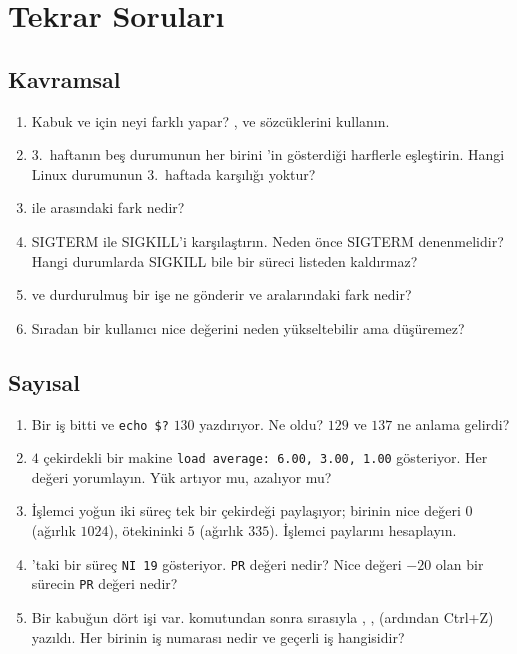 \section{Tekrar Soruları}

\subsection*{Kavramsal}
\begin{enumerate}[leftmargin=1.6em]
  \item Kabuk  ve  için neyi farklı yapar? ,  ve  sözcüklerini kullanın.
  \item 3.~haftanın beş durumunun her birini 'in gösterdiği harflerle eşleştirin. Hangi Linux durumunun 3.~haftada karşılığı yoktur?
  \item {} ile  arasındaki fark nedir?
  \item SIGTERM ile SIGKILL'i karşılaştırın. Neden önce SIGTERM denenmelidir? Hangi durumlarda SIGKILL bile bir süreci listeden kaldırmaz?
  \item {} ve  durdurulmuş bir işe ne gönderir ve aralarındaki fark nedir?
  \item Sıradan bir kullanıcı nice değerini neden yükseltebilir ama düşüremez?
\end{enumerate}

\subsection*{Sayısal}
\begin{enumerate}[leftmargin=1.6em,resume]
  \item Bir iş bitti ve \verb|echo $?| $130$ yazdırıyor. Ne oldu? $129$ ve $137$ ne anlama gelirdi?
  \item $4$ çekirdekli bir makine \texttt{load average: 6.00, 3.00, 1.00} gösteriyor. Her değeri yorumlayın. Yük artıyor mu, azalıyor mu?
  \item İşlemci yoğun iki süreç tek bir çekirdeği paylaşıyor; birinin nice değeri $0$ (ağırlık $1024$), ötekininki $5$ (ağırlık $335$). İşlemci paylarını hesaplayın.
  \item {}'taki bir süreç \texttt{NI 19} gösteriyor. \texttt{PR} değeri nedir? Nice değeri $-20$ olan bir sürecin \texttt{PR} değeri nedir?
  \item Bir kabuğun dört işi var.  komutundan sonra sırasıyla , ,  (ardından Ctrl+Z) yazıldı. Her birinin iş numarası nedir ve geçerli iş hangisidir?
\end{enumerate}

